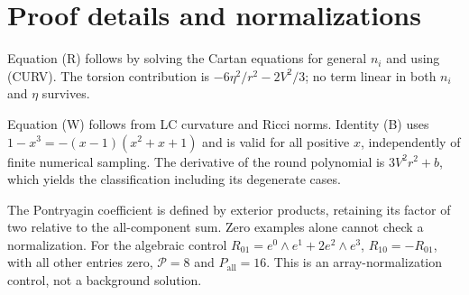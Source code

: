 \section{Proof details and normalizations}
\label{sec:revised13}

Equation (R) follows by solving the Cartan equations for general $n_i$ and using (CURV). The torsion contribution is $-6\eta^2/r^2-2V^2/3$; no term linear in both $n_i$ and $\eta$ survives.

Equation (W) follows from LC curvature and Ricci norms. Identity (B) uses $1-x^3=-(x-1)(x^2+x+1)$ and is valid for all positive $x$, independently of finite numerical sampling. The derivative of the round polynomial is $3V^2r^2+b$, which yields the classification including its degenerate cases.

The Pontryagin coefficient is defined by exterior products, retaining its factor of two relative to the all-component sum. Zero examples alone cannot check a normalization. For the algebraic control $R_{01}=e^0\wedge e^1+2e^2\wedge e^3$, $R_{10}=-R_{01}$, with all other entries zero, $\mathcal P=8$ and $P_{\mathrm{all}}=16$. This is an array-normalization control, not a background solution.
